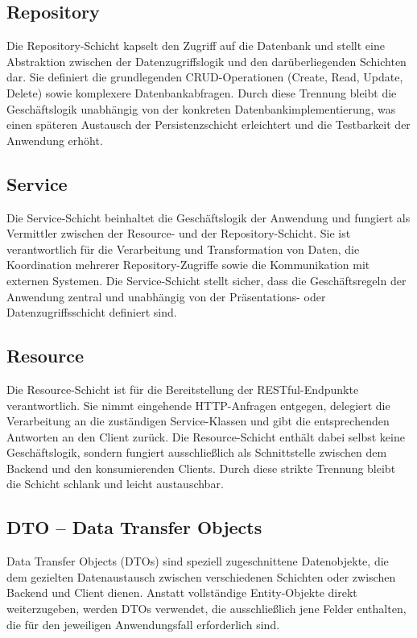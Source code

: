 \subsection{Repository}

Die Repository-Schicht kapselt den Zugriff auf die Datenbank und stellt eine
Abstraktion zwischen der Datenzugriffslogik und den darüberliegenden Schichten dar.
Sie definiert die grundlegenden CRUD-Operationen (Create, Read, Update, Delete) sowie
komplexere Datenbankabfragen. Durch diese Trennung bleibt die Geschäftslogik
unabhängig von der konkreten Datenbankimplementierung, was einen späteren Austausch
der Persistenzschicht erleichtert und die Testbarkeit der Anwendung erhöht.

\subsection{Service}

Die Service-Schicht beinhaltet die Geschäftslogik der Anwendung und fungiert als
Vermittler zwischen der Resource- und der Repository-Schicht. Sie ist verantwortlich
für die Verarbeitung und Transformation von Daten, die Koordination mehrerer
Repository-Zugriffe sowie die Kommunikation mit externen Systemen. Die Service-Schicht
stellt sicher, dass die Geschäftsregeln der Anwendung zentral und unabhängig von
der Präsentations- oder Datenzugriffsschicht definiert sind.

\subsection{Resource}

Die Resource-Schicht ist für die Bereitstellung der RESTful-Endpunkte verantwortlich.
Sie nimmt eingehende HTTP-Anfragen entgegen, delegiert die Verarbeitung an die
zuständigen Service-Klassen und gibt die entsprechenden Antworten an den Client zurück.
Die Resource-Schicht enthält dabei selbst keine Geschäftslogik, sondern fungiert
ausschließlich als Schnittstelle zwischen dem Backend und den konsumierenden Clients.
Durch diese strikte Trennung bleibt die Schicht schlank und leicht austauschbar.

\subsection{DTO -- Data Transfer Objects}

Data Transfer Objects (DTOs) sind speziell zugeschnittene Datenobjekte, die dem
gezielten Datenaustausch zwischen verschiedenen Schichten oder zwischen Backend und
Client dienen. Anstatt vollständige Entity-Objekte direkt weiterzugeben, werden DTOs
verwendet, die ausschließlich jene Felder enthalten, die für den jeweiligen
Anwendungsfall erforderlich sind.

